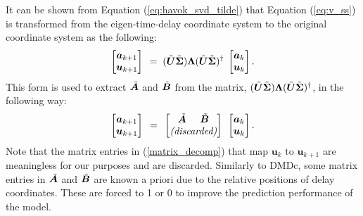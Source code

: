     It can be shown from Equation (\ref{eq:havok_svd_tilde}) that Equation (\ref{eq:v_ss}) is transformed from the eigen-time-delay coordinate system to the original coordinate system as the following:
    \begin{equation} \label{eq:v_ss_a} 
        \begin{bmatrix}
            \bm{a}_{k+1}  \\  \bm{u}_{k+1} 
        \end{bmatrix}
       \phantom{.} = \phantom{.} (\Tilde{\bm{U}} \Tilde{\bm{\Sigma}}) \bm{\Lambda} (\Tilde{\bm{U}}  \Tilde{\bm{\Sigma}})^{\dagger} \phantom{.}
        \begin{bmatrix}
            \bm{a}_{k}  \\  \bm{u}_{k} 
        \end{bmatrix} .
    \end{equation}    
    This form is used to extract $\Tilde{\bm{A}}$ and $\Tilde{\bm{B}}$ from the matrix,
    \( 
        (\Tilde{\bm{U}} \Tilde{\bm{\Sigma}}) \bm{\Lambda} (\Tilde{\bm{U}}  \Tilde{\bm{\Sigma}})^{\dagger}
    \), in the following way:
    \begin{equation} \label{matrix_decomp}
        \begin{bmatrix}
            \bm{a}_{k+1}  \\  \bm{u}_{k+1} 
        \end{bmatrix}
        \phantom{.} = \phantom{.} 
        \begin{bmatrix}
            \Tilde{\bm{A}} \phantom{.....} \Tilde{\bm{B}} \\
            \textit{(discarded)}
        \end{bmatrix}
        \phantom{.}
        \begin{bmatrix}
            \bm{a}_{k}  \\  \bm{u}_{k} 
        \end{bmatrix}.
    \end{equation}    
    Note that the matrix entries in (\ref{matrix_decomp}) that map $\bm{u}_k$ to $\bm{u}_{k+1}$ are meaningless for our purposes and are discarded.
    Similarly to DMDc, some matrix entries in $\Tilde{\bm{A}}$ and $\Tilde{\bm{B}}$ are known a priori due to the relative positions of delay coordinates. These are forced to 1 or 0 to improve the prediction performance of the model.
    
